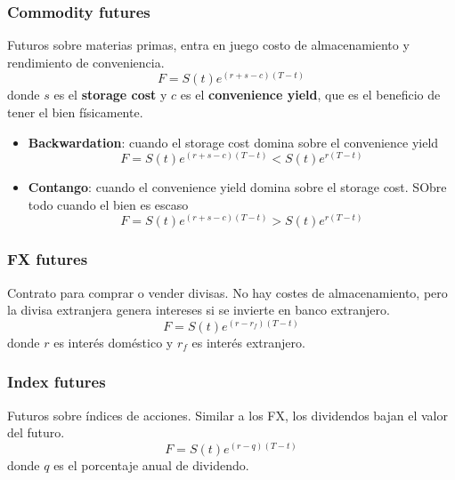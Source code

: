 \subsubsection{Commodity futures}
Futuros sobre materias primas, entra en juego costo de almacenamiento y rendimiento de conveniencia.
$$F=S(t)e^{(r+s-c)(T-t)}$$
donde $s$ es el \textbf{storage cost} y $c$ es el \textbf{convenience yield}, que es el beneficio de tener el bien físicamente.
\begin{itemize}
    \item \textbf{Backwardation}: cuando el storage cost domina sobre el convenience yield
    $$F=S(t)e^{(r+s-c)(T-t)}<S(t)e^{r(T-t)}$$
    \item \textbf{Contango}: cuando el convenience yield domina sobre el storage cost. SObre todo cuando el bien es escaso
    $$F=S(t)e^{(r+s-c)(T-t)}>S(t)e^{r(T-t)}$$
\end{itemize}


\subsubsection{FX futures}
Contrato para comprar o vender divisas. No hay costes de almacenamiento, pero la divisa extranjera genera intereses si se invierte en banco extranjero.
$$F=S(t)e^{(r-r_f)(T-t)}$$
donde $r$ es interés doméstico y $r_f$ es interés extranjero.


\subsubsection{Index futures}
Futuros sobre índices de acciones. Similar a los FX, los dividendos bajan el valor del futuro.
$$F=S(t)e^{(r-q)(T-t)}$$
donde $q$ es el porcentaje anual de dividendo.





